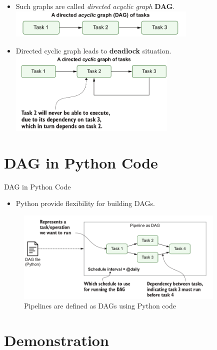 \documentclass[14pt, aspectratio=169]{beamer}
\begin{document}
	\begin{frame}
		\begin{itemize}
			\item Such graphs are called \textit{directed acyclic graph} \textbf{DAG}.
			\includegraphics[width=9cm]{dag.png}
			
			\hspace{1cm}
			\item Directed cyclic graph leads to \textbf{deadlock} situation.
			\includegraphics[width=8cm]{dcg.png}
		\end{itemize}
	\end{frame}

	\section{DAG in Python Code}
	\begin{frame}{DAG in Python Code}
		\begin{itemize}
			\item Python provide flexibility for building DAGs.
		\end{itemize}
		\begin{figure}[H]
			\centering
			\includegraphics[width=10cm]{pipeline_as_dag.png}
			\caption{Pipelines are defined as DAGs using Python code}
		\end{figure}
	\end{frame}

	\section{Demonstration}
\end{document}
